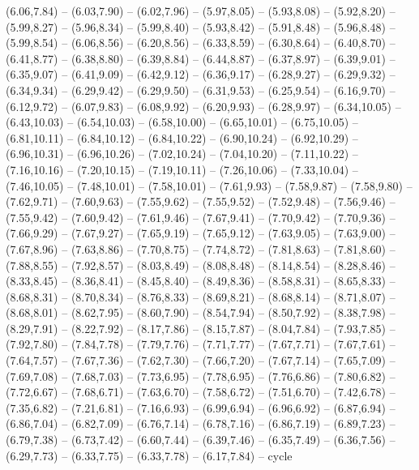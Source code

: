 \expandafter\def\csname geo:gebiet:DE-ST\endcsname{
  (6.06,7.84) -- (6.03,7.90) -- (6.02,7.96) -- (5.97,8.05) -- (5.93,8.08) -- (5.92,8.20) -- (5.99,8.27) -- (5.96,8.34) -- (5.99,8.40) -- (5.93,8.42) -- (5.91,8.48) -- (5.96,8.48) -- (5.99,8.54) -- (6.06,8.56) -- (6.20,8.56) -- (6.33,8.59) -- (6.30,8.64) -- (6.40,8.70) -- (6.41,8.77) -- (6.38,8.80) -- (6.39,8.84) -- (6.44,8.87) -- (6.37,8.97) -- (6.39,9.01) -- (6.35,9.07) -- (6.41,9.09) -- (6.42,9.12) -- (6.36,9.17) -- (6.28,9.27) -- (6.29,9.32) -- (6.34,9.34) -- (6.29,9.42) -- (6.29,9.50) -- (6.31,9.53) -- (6.25,9.54) -- (6.16,9.70) -- (6.12,9.72) -- (6.07,9.83) -- (6.08,9.92) -- (6.20,9.93) -- (6.28,9.97) -- (6.34,10.05) -- (6.43,10.03) -- (6.54,10.03) -- (6.58,10.00) -- (6.65,10.01) -- (6.75,10.05) -- (6.81,10.11) -- (6.84,10.12) -- (6.84,10.22) -- (6.90,10.24) -- (6.92,10.29) -- (6.96,10.31) -- (6.96,10.26) -- (7.02,10.24) -- (7.04,10.20) -- (7.11,10.22) -- (7.16,10.16) -- (7.20,10.15) -- (7.19,10.11) -- (7.26,10.06) -- (7.33,10.04) -- (7.46,10.05) -- (7.48,10.01) -- (7.58,10.01) -- (7.61,9.93) -- (7.58,9.87) -- (7.58,9.80) -- (7.62,9.71) -- (7.60,9.63) -- (7.55,9.62) -- (7.55,9.52) -- (7.52,9.48) -- (7.56,9.46) -- (7.55,9.42) -- (7.60,9.42) -- (7.61,9.46) -- (7.67,9.41) -- (7.70,9.42) -- (7.70,9.36) -- (7.66,9.29) -- (7.67,9.27) -- (7.65,9.19) -- (7.65,9.12) -- (7.63,9.05) -- (7.63,9.00) -- (7.67,8.96) -- (7.63,8.86) -- (7.70,8.75) -- (7.74,8.72) -- (7.81,8.63) -- (7.81,8.60) -- (7.88,8.55) -- (7.92,8.57) -- (8.03,8.49) -- (8.08,8.48) -- (8.14,8.54) -- (8.28,8.46) -- (8.33,8.45) -- (8.36,8.41) -- (8.45,8.40) -- (8.49,8.36) -- (8.58,8.31) -- (8.65,8.33) -- (8.68,8.31) -- (8.70,8.34) -- (8.76,8.33) -- (8.69,8.21) -- (8.68,8.14) -- (8.71,8.07) -- (8.68,8.01) -- (8.62,7.95) -- (8.60,7.90) -- (8.54,7.94) -- (8.50,7.92) -- (8.38,7.98) -- (8.29,7.91) -- (8.22,7.92) -- (8.17,7.86) -- (8.15,7.87) -- (8.04,7.84) -- (7.93,7.85) -- (7.92,7.80) -- (7.84,7.78) -- (7.79,7.76) -- (7.71,7.77) -- (7.67,7.71) -- (7.67,7.61) -- (7.64,7.57) -- (7.67,7.36) -- (7.62,7.30) -- (7.66,7.20) -- (7.67,7.14) -- (7.65,7.09) -- (7.69,7.08) -- (7.68,7.03) -- (7.73,6.95) -- (7.78,6.95) -- (7.76,6.86) -- (7.80,6.82) -- (7.72,6.67) -- (7.68,6.71) -- (7.63,6.70) -- (7.58,6.72) -- (7.51,6.70) -- (7.42,6.78) -- (7.35,6.82) -- (7.21,6.81) -- (7.16,6.93) -- (6.99,6.94) -- (6.96,6.92) -- (6.87,6.94) -- (6.86,7.04) -- (6.82,7.09) -- (6.76,7.14) -- (6.78,7.16) -- (6.86,7.19) -- (6.89,7.23) -- (6.79,7.38) -- (6.73,7.42) -- (6.60,7.44) -- (6.39,7.46) -- (6.35,7.49) -- (6.36,7.56) -- (6.29,7.73) -- (6.33,7.75) -- (6.33,7.78) -- (6.17,7.84) -- cycle}
